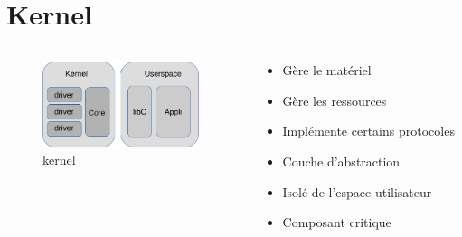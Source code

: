 \section{Kernel}
\begin{frame}
	\begin{columns}
	\begin{column}{0.38\linewidth}
		\begin{figure}
			\includegraphics[height=2.5cm]{img/arch_linux_full.png}
			 \caption{kernel}
		\end{figure}
	\end{column}
	\begin{column}{0.60\linewidth}
		\begin{itemize}
			\item<2-> Gère le matériel
			\item<3-> Gère les ressources
			\item<4-> Implémente certains protocoles
			\item<5-> Couche d'abstraction
			\item<6-> Isolé de l'espace utilisateur
			\item<7-> Composant critique
		\end{itemize}
	\end{column}
	\end{columns}
\end{frame}



